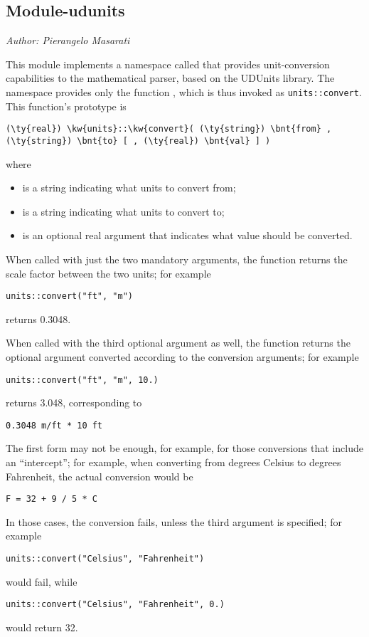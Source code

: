 \subsection{Module-udunits}
\emph{Author: Pierangelo Masarati}

\noindent
This module implements a namespace called 
that provides unit-conversion capabilities
to the mathematical parser, based on the UDUnits library.
The namespace provides only the function ,
which is thus invoked as \texttt{units::convert}.
This function's prototype is
\begin{Verbatim}[commandchars=\\\{\}]
    (\ty{real}) \kw{units}::\kw{convert}( (\ty{string}) \bnt{from} , (\ty{string}) \bnt{to} [ , (\ty{real}) \bnt{val} ] )
\end{Verbatim}
where
\begin{itemize}
\item {} is a string indicating what units to convert from;
\item {} is a string indicating what units to convert to;
\item {} is an optional real argument that indicates what value should be converted.
\end{itemize}
When called with just the two mandatory arguments, the function returns the
scale factor between the two units; for example
\begin{Verbatim}[commandchars=\\\{\}]
    units::convert("ft", "m")
\end{Verbatim}
returns 0.3048.

When called with the third optional argument  as well, the function returns
the optional argument  converted according to the conversion arguments;
for example
\begin{Verbatim}[commandchars=\\\{\}]
    units::convert("ft", "m", 10.)
\end{Verbatim}
returns 3.048, corresponding to
\begin{Verbatim}[commandchars=\\\{\}]
    0.3048 m/ft * 10 ft
\end{Verbatim}

The first form may not be enough, for example, for those conversions
that include an ``intercept''; for example, when converting from degrees 
Celsius to degrees Fahrenheit, the actual conversion would be
\begin{Verbatim}[commandchars=\\\{\}]
    F = 32 + 9 / 5 * C
\end{Verbatim}
In those cases, the conversion fails, unless the third argument 
is specified; for example
\begin{Verbatim}[commandchars=\\\{\}]
    units::convert("Celsius", "Fahrenheit")
\end{Verbatim}
would fail, while
\begin{Verbatim}[commandchars=\\\{\}]
    units::convert("Celsius", "Fahrenheit", 0.)
\end{Verbatim}
would return 32.

